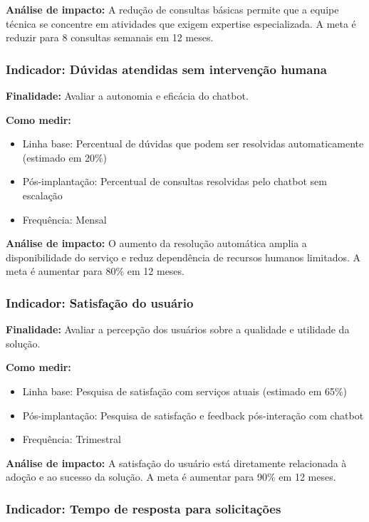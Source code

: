 \documentclass[12pt,a4paper]{article}
\begin{document}
\textbf{Análise de impacto:} A redução de consultas básicas permite que a equipe técnica se concentre em atividades que exigem expertise especializada. A meta é reduzir para 8 consultas semanais em 12 meses.

\subsubsection{Indicador: Dúvidas atendidas sem intervenção humana}

\textbf{Finalidade:} Avaliar a autonomia e eficácia do chatbot.

\textbf{Como medir:} 
\begin{itemize}
    \item Linha base: Percentual de dúvidas que podem ser resolvidas automaticamente (estimado em 20\%)
    \item Pós-implantação: Percentual de consultas resolvidas pelo chatbot sem escalação
    \item Frequência: Mensal
\end{itemize}

\textbf{Análise de impacto:} O aumento da resolução automática amplia a disponibilidade do serviço e reduz dependência de recursos humanos limitados. A meta é aumentar para 80\% em 12 meses.

\subsubsection{Indicador: Satisfação do usuário}

\textbf{Finalidade:} Avaliar a percepção dos usuários sobre a qualidade e utilidade da solução.

\textbf{Como medir:} 
\begin{itemize}
    \item Linha base: Pesquisa de satisfação com serviços atuais (estimado em 65\%)
    \item Pós-implantação: Pesquisa de satisfação e feedback pós-interação com chatbot
    \item Frequência: Trimestral
\end{itemize}

\textbf{Análise de impacto:} A satisfação do usuário está diretamente relacionada à adoção e ao sucesso da solução. A meta é aumentar para 90\% em 12 meses.

\subsubsection{Indicador: Tempo de resposta para solicitações}
\end{document}
